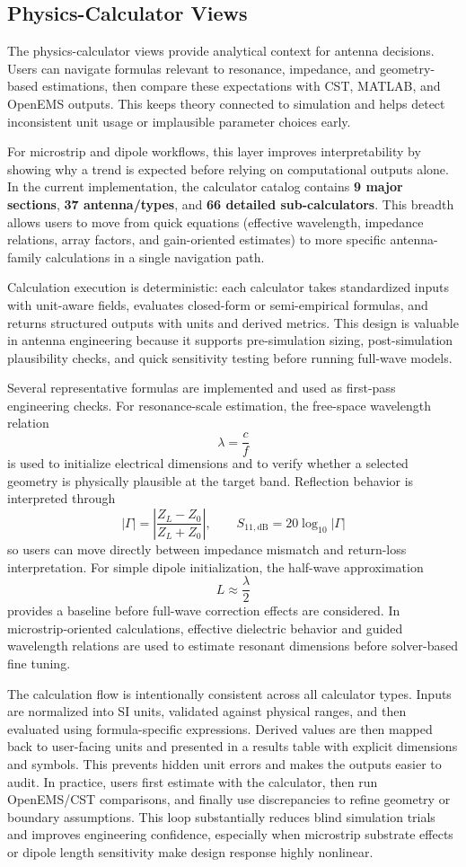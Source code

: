 \documentclass[12pt,a4paper]{article}
\begin{document}
\subsection{Physics-Calculator Views}
The physics-calculator views provide analytical context for antenna decisions. Users can navigate formulas relevant to resonance, impedance, and geometry-based estimations, then compare these expectations with CST, MATLAB, and OpenEMS outputs. This keeps theory connected to simulation and helps detect inconsistent unit usage or implausible parameter choices early.

For microstrip and dipole workflows, this layer improves interpretability by showing why a trend is expected before relying on computational outputs alone. In the current implementation, the calculator catalog contains \textbf{9 major sections}, \textbf{37 antenna/types}, and \textbf{66 detailed sub-calculators}. This breadth allows users to move from quick equations (effective wavelength, impedance relations, array factors, and gain-oriented estimates) to more specific antenna-family calculations in a single navigation path.

Calculation execution is deterministic: each calculator takes standardized inputs with unit-aware fields, evaluates closed-form or semi-empirical formulas, and returns structured outputs with units and derived metrics. This design is valuable in antenna engineering because it supports pre-simulation sizing, post-simulation plausibility checks, and quick sensitivity testing before running full-wave models.

Several representative formulas are implemented and used as first-pass engineering checks. For resonance-scale estimation, the free-space wavelength relation
\[
\lambda=\frac{c}{f}
\]
is used to initialize electrical dimensions and to verify whether a selected geometry is physically plausible at the target band. Reflection behavior is interpreted through
\[
|\Gamma|=\left|\frac{Z_L-Z_0}{Z_L+Z_0}\right|,\qquad S_{11,\mathrm{dB}}=20\log_{10}|\Gamma|
\]
so users can move directly between impedance mismatch and return-loss interpretation. For simple dipole initialization, the half-wave approximation
\[
L\approx \frac{\lambda}{2}
\]
provides a baseline before full-wave correction effects are considered. In microstrip-oriented calculations, effective dielectric behavior and guided wavelength relations are used to estimate resonant dimensions before solver-based fine tuning.

The calculation flow is intentionally consistent across all calculator types. Inputs are normalized into SI units, validated against physical ranges, and then evaluated using formula-specific expressions. Derived values are then mapped back to user-facing units and presented in a results table with explicit dimensions and symbols. This prevents hidden unit errors and makes the outputs easier to audit. In practice, users first estimate with the calculator, then run OpenEMS/CST comparisons, and finally use discrepancies to refine geometry or boundary assumptions. This loop substantially reduces blind simulation trials and improves engineering confidence, especially when microstrip substrate effects or dipole length sensitivity make design response highly nonlinear.
\end{document}
